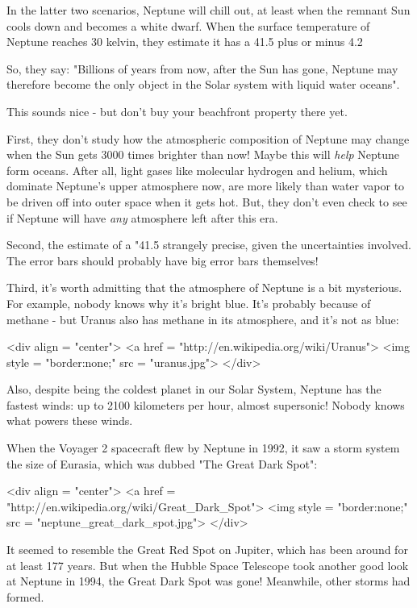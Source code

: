 In the latter two scenarios, Neptune will chill out, at least when the
remnant Sun cools down and becomes a white dwarf.    When the surface 
temperature of Neptune reaches 30 kelvin, they estimate it has a 41.5%
plus or minus 4.2%

So, they say: "Billions of years from now, after the Sun has gone, 
Neptune may therefore become the only object in the Solar system
with liquid water oceans".

This sounds nice - but don't buy your beachfront property there yet.  

First, they don't study how the atmospheric composition of Neptune 
may change when the Sun gets 3000 times brighter than now!  Maybe this 
will \emph{help} Neptune form oceans.  After all, light gases like molecular 
hydrogen and helium, which dominate Neptune's upper atmosphere now, are 
more likely than water vapor to be driven off into outer space when it 
gets hot.  But, they don't even check to see if Neptune will have 
\emph{any} atmosphere left after this era.

Second, the estimate of a "41.5%
strangely precise, given the uncertainties involved.  The error 
bars should probably have big error bars themselves!

Third, it's worth admitting that the atmosphere of Neptune is a bit
mysterious.  For example, nobody knows why it's bright blue.  It's probably 
because of methane - but Uranus also has methane in its atmosphere,
and it's not as blue:

<div align = "center">
<a href = "http://en.wikipedia.org/wiki/Uranus">
<img style = "border:none;" src = "uranus.jpg">
</div>

Also, despite being the coldest planet in our 
Solar System, Neptune has the fastest winds: up to 2100 kilometers per 
hour, almost supersonic!  Nobody knows what powers these winds.  

When the Voyager 2 spacecraft flew by Neptune in 1992, it saw a storm 
system the size of Eurasia, which was dubbed "The Great Dark Spot":

<div align = "center">
<a href = "http://en.wikipedia.org/wiki/Great_Dark_Spot">
<img style = "border:none;" src = "neptune_great_dark_spot.jpg">
</div>
  
It seemed to resemble the Great Red Spot on Jupiter, which has been 
around for at least 177 years.  But when the Hubble Space Telescope 
took another good look at Neptune in 1994, the Great Dark Spot was 
gone!  Meanwhile, other storms had formed.  

